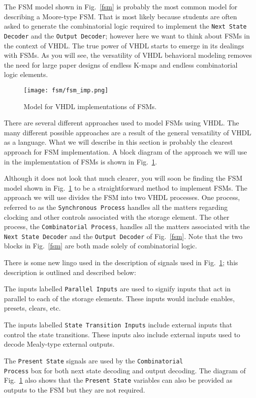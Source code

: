 The FSM model shown in Fig.~\ref{fsm} is probably the most common model for describing a Moore-type FSM. That is most likely because students are often asked to generate the combinatorial logic required to implement the \texttt{Next State Decoder} and the \texttt{Output Decoder}; however here we want to think about FSMs in the context of VHDL. The true power of VHDL starts to emerge in its dealings with FSMs. As you will see, the versatility of VHDL behavioral modeling removes the need for large paper designs of endless K-maps and endless combinatorial logic elements.

\begin{figure}[t]
    \centering
	\texttt{[image: fsm/fsm\_imp.png]}
	\caption{Model for VHDL implementations of FSMs.}
	\label{fsm_imp}
\end{figure}

There are several different approaches used to model FSMs using VHDL. The many different possible approaches are a result of the general versatility of VHDL as a language. What we will describe in this section is probably the clearest approach for FSM implementation. A block diagram of the approach we will use in the implementation of FSMs is shown in Fig.~\ref{fsm_imp}.

Although it does not look that much clearer, you will soon be finding the FSM model shown in Fig.~\ref{fsm_imp} to be a straightforward method to implement FSMs. The approach we will use divides the FSM into two VHDL processes. One process, referred to as the \texttt{Synchronous Process} handles all the matters regarding clocking and other controls associated with the storage element. The other process, the \texttt{Combinatorial Process}, handles all the matters associated with the \texttt{Next State Decoder} and the \texttt{Output Decoder} of Fig.~\ref{fsm}. Note that the two blocks in Fig.~\ref{fsm} are both made solely of combinatorial logic.


There is some new lingo used in the description of signals used in Fig.~\ref{fsm_imp}; this description is outlined and described below: 
\begin{my_list}
\item The inputs labelled \texttt{Parallel Inputs} are used to signify inputs that act in parallel to each of the storage elements. These inputs would include enables, presets, clears, etc. 

\item The inputs labelled \texttt{State Transition Inputs} include external inputs that control the state transitions. These inputs also include external inputs used to decode Mealy-type external outputs. 

\item The \texttt{Present State} signals are used by the \texttt{Combinatorial \\ Process} box for both next state decoding and output decoding. The diagram of Fig.~\ref{fsm_imp} also shows that the \texttt{Present State} variables can also be provided as outputs to the FSM but they are not required.
\end{my_list}

